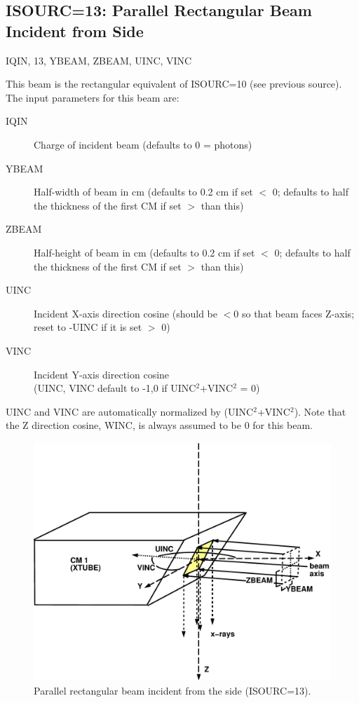 \documentclass[12pt,twoside]{article}
\newcommand{\cen}[1]{\begin{center} #1 \end{center}                   }
\begin{document}
\clearpage

\subsection{ISOURC=13: Parallel Rectangular Beam Incident from Side}
\cen{IQIN, 13, YBEAM, ZBEAM, UINC, VINC}
 
This beam is the rectangular equivalent of ISOURC=10 (see previous
source).
The input parameters for this beam are:
\begin{description}
\item [IQIN] Charge of incident beam (defaults to 0 = photons)
\item [YBEAM] Half-width of beam in cm (defaults to 0.2 cm if set $<$ 0;
defaults to half the thickness of the first CM if set $>$ than this)
\item [ZBEAM] Half-height of beam in cm (defaults to 0.2 cm if set $<$ 0;
defaults to half the thickness of the first CM if set $>$ than this)
\item [UINC] Incident X-axis direction cosine (should be $<$0 so that beam
faces Z-axis; reset to -UINC if it is set $>$ 0)
\item [VINC] Incident Y-axis direction cosine \\
(UINC, VINC default to -1,0 if UINC$^2$+VINC$^2$ = 0)
\end{description}
UINC and VINC are automatically normalized by (UINC$^2$+VINC$^2$).  Note
that the Z direction cosine, WINC, is always assumed to be 0 for this
beam.
\begin{figure}[htbp]
\begin{center}
\leavevmode
\mbox{}\hspace{0cm}
\includegraphics[height=9cm]{figures/src13}
\caption[ISOURC=13: Rectangular beam for XTUBE.]
{Parallel rectangular beam incident from the side (ISOURC=13).}
\label{fig_src13}
\end{center}
\end{figure}
\end{document}
